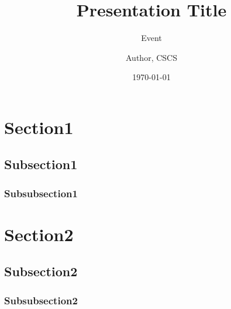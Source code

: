 \documentclass{beamer}
\author{Author, CSCS}
\title{Presentation Title}
\subtitle{Event}
\date{\today}
\begin{document}
\cscstitle

\begin{frame}
\end{frame}


\section{Section1}
\subsection{Subsection1}
\subsubsection{Subsubsection1}

\section{Section2}
\subsection{Subsection2}
\subsubsection{Subsubsection2}

\end{document}
